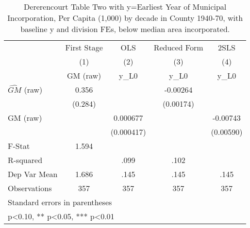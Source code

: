 \begin{table}[htbp]\centering
\def\sym#1{\ifmmode^{#1}\else\(^{#1}\)\fi}
\caption{Dererencourt Table Two with y=Earliest Year of Municipal Incorporation, Per Capita (1,000) by decade in County 1940-70, with baseline y and division FEs, below median area incorporated.}
\begin{tabular}{l*{4}{c}}
\toprule
                    & First Stage   &         OLS   &Reduced Form   &        2SLS   \\
                    &\multicolumn{1}{c}{(1)}&\multicolumn{1}{c}{(2)}&\multicolumn{1}{c}{(3)}&\multicolumn{1}{c}{(4)}\\
                    &\multicolumn{1}{c}{GM  (raw)}&\multicolumn{1}{c}{y\_L0}&\multicolumn{1}{c}{y\_L0}&\multicolumn{1}{c}{y\_L0}\\
\midrule
$\hat{GM}$ (raw)    &       0.356   &               &    -0.00264   &               \\
                    &     (0.284)   &               &   (0.00174)   &               \\
\addlinespace
GM  (raw)           &               &    0.000677   &               &    -0.00743   \\
                    &               &  (0.000417)   &               &   (0.00590)   \\
\midrule
F-Stat              &       1.594   &               &               &               \\
R-squared           &               &        .099   &        .102   &               \\
Dep Var Mean        &       1.686   &        .145   &        .145   &        .145   \\
Observations        &         357   &         357   &         357   &         357   \\
\bottomrule
\multicolumn{5}{l}{\footnotesize Standard errors in parentheses}\\
\multicolumn{5}{l}{\footnotesize * p<0.10, ** p<0.05, *** p<0.01}\\
\end{tabular}
\end{table}
